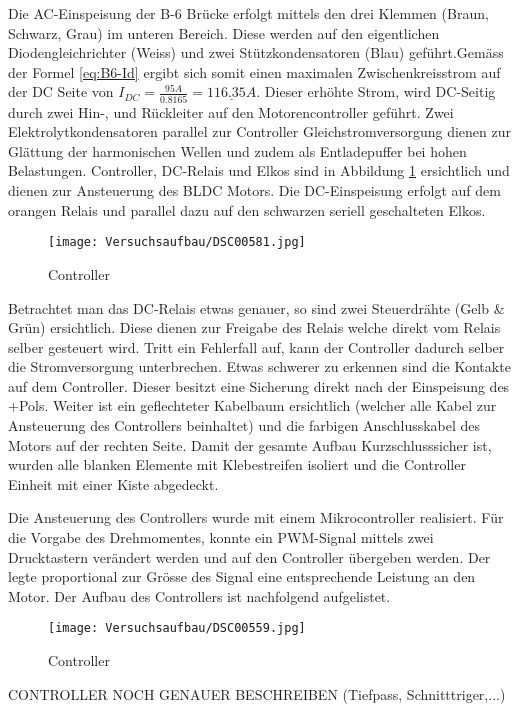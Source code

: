 Die AC-Einspeisung der B-6 Brücke erfolgt mittels den drei Klemmen (Braun, Schwarz, Grau) im unteren Bereich. Diese werden auf den eigentlichen Diodengleichrichter (Weiss) und zwei Stützkondensatoren (Blau) geführt.Gemäss der Formel \ref{eq:B6-Id} ergibt sich somit einen maximalen Zwischenkreisstrom auf der DC Seite von $I_{DC}=\frac{95A}{0.8165} =\underline{116.35A}$.
Dieser erhöhte Strom, wird DC-Seitig durch zwei Hin-, und Rückleiter auf den Motorencontroller geführt. Zwei Elektrolytkondensatoren parallel zur Controller Gleichstromversorgung dienen zur Glättung der harmonischen Wellen und zudem als Entladepuffer bei hohen Belastungen. Controller, DC-Relais und Elkos sind in Abbildung \ref{fig:Controller} ersichtlich und dienen zur Ansteuerung des BLDC Motors. Die DC-Einspeisung erfolgt auf dem orangen Relais und parallel dazu auf den schwarzen seriell geschalteten Elkos.

\begin{figure}[H]
	\begin{center}
		\texttt{[image: Versuchsaufbau/DSC00581.jpg]}
		\caption[Controller]{Controller}
		\label{fig:Controller}
	\end{center}
\end{figure}

Betrachtet man das DC-Relais etwas genauer, so sind zwei Steuerdrähte (Gelb \& Grün) ersichtlich. Diese dienen zur Freigabe des Relais welche direkt vom Relais selber gesteuert wird. Tritt ein Fehlerfall auf, kann der Controller dadurch selber die Stromversorgung unterbrechen. Etwas schwerer zu erkennen sind die Kontakte auf dem Controller. Dieser besitzt eine Sicherung direkt nach der Einspeisung des +Pols. Weiter ist ein geflechteter Kabelbaum ersichtlich (welcher alle Kabel zur Ansteuerung des Controllers beinhaltet) und die farbigen Anschlusskabel des Motors auf der rechten Seite. Damit der gesamte Aufbau Kurzschlusssicher ist, wurden alle blanken Elemente mit Klebestreifen isoliert und die Controller Einheit mit einer Kiste abgedeckt.

Die Ansteuerung des Controllers wurde mit einem Mikrocontroller realisiert. Für die Vorgabe des Drehmomentes, konnte ein PWM-Signal mittels zwei Drucktastern verändert werden und auf den Controller übergeben werden. Der legte proportional zur Grösse des Signal eine entsprechende Leistung an den Motor. Der Aufbau des Controllers ist nachfolgend aufgelistet.

\begin{figure}[H]
	\begin{center}
		\texttt{[image: Versuchsaufbau/DSC00559.jpg]}
		\caption[Controller]{Controller}
		\label{fig:Mikrocontroller}
	\end{center}
\end{figure}
CONTROLLER NOCH GENAUER BESCHREIBEN (Tiefpass, Schnitttriger,...)



